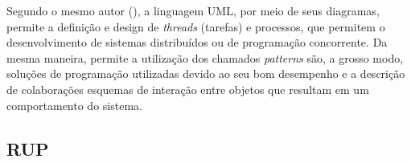 Segundo o mesmo autor (\citeyear{eng-2015}), a linguagem UML, por meio de seus diagramas, permite a definição e design de \textit{threads} (tarefas) e processos, que permitem o desenvolvimento de sistemas distribuídos ou de programação concorrente. Da mesma maneira, permite a utilização dos chamados \textit{patterns} são, a grosso modo, soluções de programação utilizadas devido ao seu bom desempenho e a descrição de colaborações esquemas de interação entre objetos que resultam em um comportamento do sistema.

\subsection{RUP}